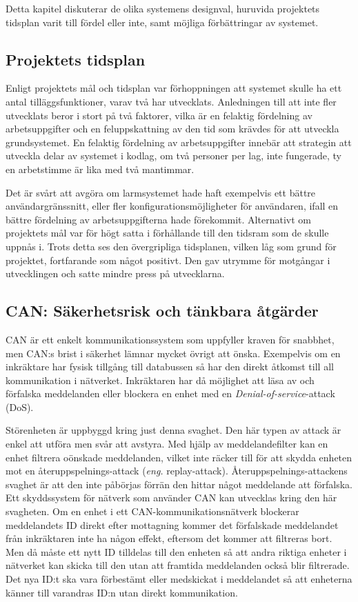 Detta kapitel diskuterar de olika systemens designval, huruvida projektets tidsplan varit till fördel eller inte, samt möjliga förbättringar av systemet.

\subsection{Projektets tidsplan}

Enligt projektets mål och tidsplan var förhoppningen att
systemet skulle ha ett antal tilläggsfunktioner, varav två har utvecklats.
Anledningen till att inte fler utvecklats beror i stort på två faktorer, vilka är en felaktig fördelning 
av arbetsuppgifter och en feluppskattning av den tid som krävdes för att utveckla grundsystemet. 
En felaktig fördelning av arbetsuppgifter innebär att strategin att utveckla delar av systemet i kodlag, om två personer per lag, inte fungerade, ty en arbetstimme är lika med två mantimmar.

Det är svårt att avgöra om larmsystemet hade haft exempelvis ett bättre användargränssnitt, eller fler konfigurationsmöjligheter för användaren, ifall en bättre fördelning av arbetsuppgifterna hade förekommit. 
Alternativt om projektets mål var för högt satta i förhållande till 
den tidsram som de skulle uppnås i. Trots detta ses den övergripliga tidsplanen, vilken låg som grund för projektet, fortfarande som något positivt. Den gav utrymme för motgångar i utvecklingen och satte mindre press på utvecklarna.

\subsection{CAN: Säkerhetsrisk och tänkbara åtgärder}

CAN är ett enkelt kommunikationssystem som uppfyller kraven för snabbhet, men CAN:s brist i säkerhet lämnar mycket övrigt att önska. Exempelvis om en inkräktare har fysisk tillgång till databussen så har den direkt åtkomst till all kommunikation i nätverket. Inkräktaren har då möjlighet att läsa av och förfalska meddelanden eller blockera en enhet med en \textit{Denial-of-service}-attack (DoS).

Störenheten är uppbyggd kring just denna svaghet. Den här typen av attack är enkel att utföra men svår att avstyra. 
Med hjälp av meddelandefilter kan en enhet filtrera oönskade meddelanden, vilket inte räcker till för att skydda enheten mot en återuppspelnings-attack (\textit{eng.} replay-attack). Återuppspelnings-attackens svaghet är att den inte påbörjas förrän den hittar något meddelande att förfalska. Ett skyddssystem för nätverk som använder CAN kan utvecklas kring den här svagheten. Om en enhet i ett CAN-kommunikationsnätverk blockerar meddelandets ID direkt efter mottagning kommer det förfalskade meddelandet från inkräktaren inte ha någon effekt, eftersom det kommer att filtreras bort. Men då måste ett nytt ID tilldelas till den enheten så att andra riktiga enheter i nätverket kan skicka till den utan att framtida meddelanden också blir filtrerade. Det nya ID:t ska vara förbestämt eller medskickat i meddelandet så att enheterna känner till varandras ID:n utan direkt kommunikation.

